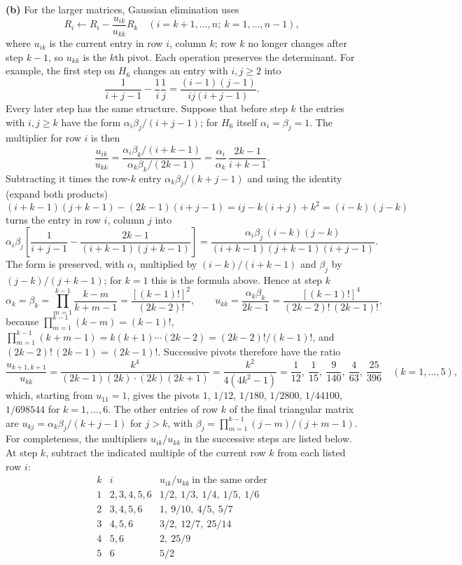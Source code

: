 \textbf{(b)} For the larger matrices, Gaussian elimination uses
\[
R_i\longleftarrow R_i-\frac{u_{ik}}{u_{kk}}R_k
\quad(i=k+1,\ldots,n;\ k=1,\ldots,n-1),
\]
where $u_{ik}$ is the current entry in row $i$, column $k$; row $k$ no
longer changes after step $k-1$, so $u_{kk}$ is the $k$th pivot.
Each operation preserves the determinant. For example, the first
step on $H_6$ changes an entry with $i,j\ge2$ into
\[
\frac1{i+j-1}-\frac1i\frac1j
=\frac{(i-1)(j-1)}{ij(i+j-1)}.
\]
Every later step has the same structure. Suppose that before step $k$
the entries with $i,j\ge k$ have the form $\alpha_i\beta_j/(i+j-1)$;
for $H_6$ itself $\alpha_i=\beta_j=1$. The multiplier for row $i$ is
then
\[
\frac{u_{ik}}{u_{kk}}
=\frac{\alpha_i\beta_k/(i+k-1)}{\alpha_k\beta_k/(2k-1)}
=\frac{\alpha_i}{\alpha_k}\,\frac{2k-1}{i+k-1}.
\]
Subtracting it times the row-$k$ entry $\alpha_k\beta_j/(k+j-1)$ and
using the identity (expand both products)
\[
(i+k-1)(j+k-1)-(2k-1)(i+j-1)=ij-k(i+j)+k^2=(i-k)(j-k)
\]
turns the entry in row $i$, column $j$ into
\[
\alpha_i\beta_j\left[\frac1{i+j-1}-\frac{2k-1}{(i+k-1)(j+k-1)}\right]
=\frac{\alpha_i\beta_j\,(i-k)(j-k)}{(i+k-1)(j+k-1)(i+j-1)}.
\]
The form is preserved, with $\alpha_i$ multiplied by $(i-k)/(i+k-1)$
and $\beta_j$ by $(j-k)/(j+k-1)$; for $k=1$ this is the formula above.
Hence at step $k$
\[
\alpha_k=\beta_k=\prod_{m=1}^{k-1}\frac{k-m}{k+m-1}
=\frac{[(k-1)!]^2}{(2k-2)!},\qquad
u_{kk}=\frac{\alpha_k\beta_k}{2k-1}
=\frac{[(k-1)!]^4}{(2k-2)!\,(2k-1)!},
\]
because $\prod_{m=1}^{k-1}(k-m)=(k-1)!$,
$\prod_{m=1}^{k-1}(k+m-1)=k(k+1)\cdots(2k-2)=(2k-2)!/(k-1)!$, and
$(2k-2)!\,(2k-1)=(2k-1)!$. Successive pivots therefore have the ratio
\[
\frac{u_{k+1,k+1}}{u_{kk}}
=\frac{k^4}{(2k-1)(2k)\cdot(2k)(2k+1)}
=\frac{k^2}{4(4k^2-1)}
=\frac1{12},\ \frac1{15},\ \frac9{140},\ \frac4{63},\ \frac{25}{396}
\quad(k=1,\ldots,5),
\]
which, starting from $u_{11}=1$, gives the pivots $1$, $1/12$, $1/180$,
$1/2800$, $1/44100$, $1/698544$ for $k=1,\ldots,6$. The other entries
of row $k$ of the final triangular matrix are
$u_{kj}=\alpha_k\beta_j/(k+j-1)$ for $j>k$,
with $\beta_j=\prod_{m=1}^{k-1}(j-m)/(j+m-1)$.
For completeness, the multipliers $u_{ik}/u_{kk}$ in the successive
steps are listed below. At step $k$, subtract the indicated multiple
of the current row $k$ from each listed row $i$:
\[
\begin{array}{c|c|c}
k&i&u_{ik}/u_{kk}\ \text{in the same order}\\\hline
1&2,3,4,5,6&1/2,\ 1/3,\ 1/4,\ 1/5,\ 1/6\\
2&3,4,5,6&1,\ 9/10,\ 4/5,\ 5/7\\
3&4,5,6&3/2,\ 12/7,\ 25/14\\
4&5,6&2,\ 25/9\\
5&6&5/2
\end{array}
\]
